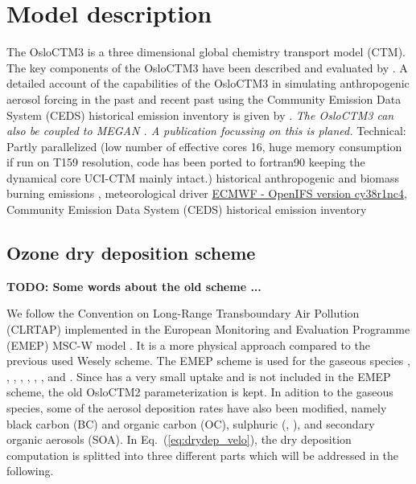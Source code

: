 \documentclass[gmd, manuscript]{copernicus}
\begin{document}
\section{Model description}
\label{sec:model_des}
The OsloCTM3 is a three dimensional global chemistry transport model (CTM). The key components of the OsloCTM3 have been described and evaluated by \citet{GMD:Sovde2012}. A detailed account of the capabilities of the OsloCTM3 in simulating anthropogenic aerosol forcing in the past and recent past using the Community Emission Data System (CEDS) historical emission inventory \citep{GMD:Hoesly2018} is given by \citet{GMD:Lund2018}. \emph{The OsloCTM3 can also be coupled to MEGAN \citep{ACP:Guenther2006}. A publication focussing on this is planed.}
Technical: Partly parallelized (low number of effective cores 16, huge memory consumption if run on T159 resolution, code has been ported to fortran90 keeping the dynamical core UCI-CTM mainly intact.)
historical anthropogenic and biomass burning emissions \citep{ACP:Lamarque2010}, meteorological driver \href{https://www.ecmwf.int/en/forecasts/documentation-and-support/evolution-ifs/cycle-38r1-summary-changes}{ECMWF - OpenIFS version cy38r1nc4}, Community Emission Data System (CEDS) historical emission inventory \citep{GMD:Hoesly2018}

\subsection{Ozone dry deposition scheme}
\label{subsec:DryDep}

{\bf TODO: Some words about the old scheme \citep{AE:Wesely1989, JGR:Hough1991}...}

We follow the Convention on Long-Range Transboundary Air Pollution (CLRTAP) implemented in the European Monitoring and Evaluation Programme (EMEP) MSC-W model \citep{ACP:Simpson2012,ICP:MappingManual2017}. It is a more physical approach compared to the previous used Wesely scheme. The EMEP scheme is used for the gaseous species , , , , , , , and . Since  has a very small uptake and is not included in the EMEP scheme, the old OsloCTM2 \citep{OsloCTM2} parameterization is kept. In adition to the gaseous species, some of the aerosol deposition rates have also been modified, namely black carbon (BC) and organic carbon (OC), sulphuric (, ), and secondary organic aerosols (SOA). In Eq.~(\ref{eq:drydep_velo}), the dry deposition computation is splitted into three different parts which will be addressed in the following.
\end{document}

